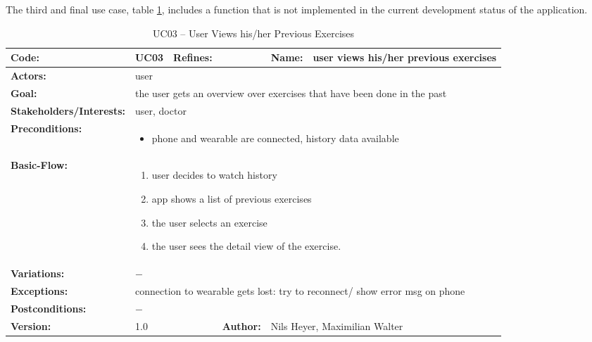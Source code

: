 \clearpage
The third and final use case, table \ref{history}, includes a function that is not implemented in the current development status of the application.
\begin{table}[H]
	\begin{tabular}{|l|l|l|l|l|l|} \hline
		\textbf{Code:} & UC03 & \textbf{Refines:} &  & \textbf{Name:} & user views his/her previous exercises \\ \hline
		\textbf{Actors:} & \multicolumn{5}{l|}{user} \\ \hline
		\textbf{Goal:} & \multicolumn{5}{l|}{the user gets an overview over exercises that have been done in the past} \\ \hline
		\textbf{Stakeholders/Interests:} & \multicolumn{5}{l|}{user, doctor} \\ \hline
		\textbf{Preconditions:} & \multicolumn{5}{l|}{\parbox{0.75\textwidth}{
			\begin{itemize}
				\item phone and wearable are connected, history data available
			\end{itemize}
		}} \\ \hline
		\textbf{Basic-Flow:} & \multicolumn{5}{l|}{\parbox{0.75\textwidth}{
			\begin{enumerate}
				\item user decides to watch history
				\item app shows a list of previous exercises
				\item the user selects an exercise
				\item the user sees the detail view of the exercise.
			\end{enumerate}
		}} \\ \hline
		\textbf{Variations:} & \multicolumn{5}{l|}{\parbox{0.75\textwidth}{
			$-$
		}} \\ \hline
		\textbf{Exceptions:} & \multicolumn{5}{l|}{\parbox{0.75\textwidth}{
			connection to wearable gets lost: try to reconnect/ show error msg on phone
		}} \\ \hline
		\textbf{Postconditions:} & \multicolumn{5}{l|}{$-$} \\ \hline
		\textbf{Version:} & \multicolumn{2}{l|}{1.0} & \textbf{Author:} & \multicolumn{2}{l|}{Nils Heyer, Maximilian Walter} \\ \hline
	\end{tabular}
	\caption{UC03 -- User Views his/her Previous Exercises}
	\label{history}
\end{table}

